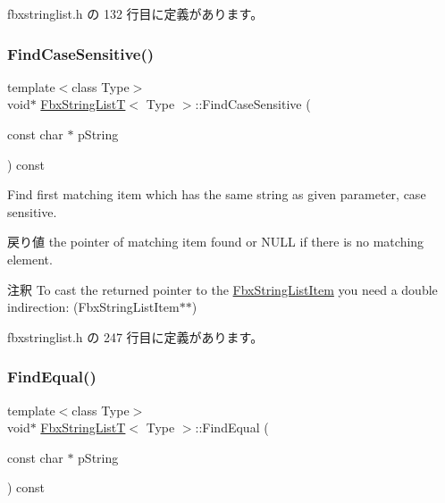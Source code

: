  fbxstringlist.\+h の 132 行目に定義があります。

\mbox{\label{class_fbx_string_list_t_a3b5a6fa9a9e231c99f15b6493627663c}} 
\subsubsection{\texorpdfstring{Find\+Case\+Sensitive()}{FindCaseSensitive()}}
{\footnotesize\ttfamily template$<$class Type$>$ \\
void$\ast$ \hyperlink{class_fbx_string_list_t}{Fbx\+String\+ListT}$<$ Type $>$\+::Find\+Case\+Sensitive (\begin{DoxyParamCaption}\item[{const char $\ast$}]{p\+String }\end{DoxyParamCaption}) const\hspace{0.3cm}{\ttfamily [inline]}}

Find first matching item which has the same string as given parameter, case sensitive. \begin{DoxyReturn}{戻り値}
the pointer of matching item found or N\+U\+LL if there is no matching element. 
\end{DoxyReturn}
\begin{DoxyRemark}{注釈}
To cast the returned pointer to the \hyperlink{class_fbx_string_list_item}{Fbx\+String\+List\+Item} you need a double indirection\+: (Fbx\+String\+List\+Item$\ast$$\ast$) 
\end{DoxyRemark}


 fbxstringlist.\+h の 247 行目に定義があります。

\mbox{\label{class_fbx_string_list_t_a476ea46cf72847c070af0868b187cef0}} 
\subsubsection{\texorpdfstring{Find\+Equal()}{FindEqual()}}
{\footnotesize\ttfamily template$<$class Type$>$ \\
void$\ast$ \hyperlink{class_fbx_string_list_t}{Fbx\+String\+ListT}$<$ Type $>$\+::Find\+Equal (\begin{DoxyParamCaption}\item[{const char $\ast$}]{p\+String }\end{DoxyParamCaption}) const\hspace{0.3cm}{\ttfamily [inline]}}

